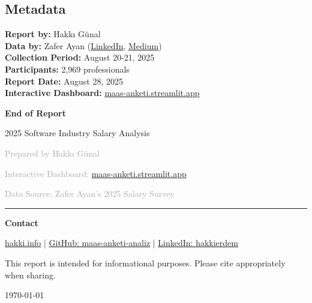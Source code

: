 \documentclass[12pt,a4paper]{article}
\begin{document}
	\subsection{Metadata}
	\begin{center}
		\textbf{Report by:} Hakkı Günal\\
		\textbf{Data by:} Zafer Ayan (\href{https://www.linkedin.com/posts/zaferayan_geleneksel-maa%C5%9F-anketi-buyrun-httpslnkdin-activity-7363866008664629248-7YcQ}{LinkedIn}, \href{https://zaferayan.medium.com/2025-a%C4%9Fustos-detayl%C4%B1-maa%C5%9F-anketi-98446d71920a}{Medium})\\
			\textbf{Collection Period:} August 20-21, 2025\\
			\textbf{Participants:} 2,969 professionals\\
			\textbf{Report Date:} August 28, 2025\\
			\textbf{Interactive Dashboard:} \href{https://maas-anketi.streamlit.app/}{maas-anketi.streamlit.app}
			\end{center}
\newpage
\thispagestyle{empty}
\begin{center}
    \vspace*{2cm}
    {\Huge \bfseries \color{titleblue} End of Report}\par
    \vspace{0.8cm}
    {\large \color{darkgray} 2025 Software Industry Salary Analysis}\par
    \vspace{0.6cm}
    \textcolor{darkgray}{Prepared by Hakkı Günal}\par
    \vspace{0.3cm}
    \textcolor{darkgray}{Interactive Dashboard: \href{https://maas-anketi.streamlit.app/}{maas-anketi.streamlit.app}}\par
    \vspace{0.3cm}
    \textcolor{darkgray}{Data Source: Zafer Ayan's 2025 Salary Survey}\par
    \vspace{1.2cm}
    \textcolor{titleblue}{\rule{0.7\textwidth}{0.8pt}}\par
    \vspace{0.8cm}
    {\large \color{titleblue} \textbf{Contact}}\par
    \vspace{0.35cm}
    {\normalsize \color{darkgray}
        \href{https://hakki.info}{hakki.info} \quad | \quad
        \href{https://github.com/erdemgunal/maas-anketi-analiz/}{GitHub: maas-anketi-analiz} \quad | \quad
        \href{https://www.linkedin.com/in/hakkierdem/}{LinkedIn: hakkierdem}
    }\par
    \vspace{0.8cm}
    {\small \color{darkgray} This report is intended for informational purposes. Please cite appropriately when sharing.}\par
    \vfill
    {\small \color{darkgray} \today}
\end{center}
\end{document}
